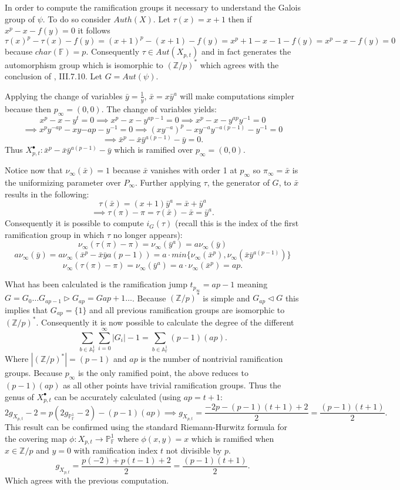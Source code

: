\documentclass[paper=a4, fontsize=11pt]{scrartcl} %
\numberwithin{equation}{section} %
\numberwithin{figure}{section} %
\numberwithin{table}{section} %
\theoremstyle{break}
\begin{document}
In order to compute the ramification groups it necessary to understand the Galois group of $\psi$. To do so consider $Auth(X)$. Let $\tau(x)=x+1$ then if $x^p - x - f(y) = 0$ it follows
$$
\tau(x)^p - \tau(x) - f(y) = (x+1)^p - (x+1) - f(y) = x^p + 1 - x - 1 - f(y) = x^p-x-f(y) = 0
$$
because $char(\mathbb{F})=p$. Consequently $\tau\in Aut(X_{p,t})$ and in fact generates the automorphism group which is isomorphic to $(\mathbb{Z}/p)^*$ which agrees with the conclusion of \cite{stitchenoth}, III.7.10. Let $G=Aut(\psi)$.

Applying the change of variables $\bar{y}=\frac{1}{y}$, $\bar{x}=x\bar{y}^a$ will make computations simpler because then $p_\infty = (0,0)$. The change of variables yields:
$$x^p-x-y^t = 0 \implies x^p-x-y^{ap-1}=0 \implies x^p-x-y^{ap}y^{-1}=0 $$
$$\implies x^p y^{-ap} -xy{-ap}-y^{-1}=0 \implies (xy^{-a})^p - xy^{-a}y^{-a(p-1)}-y^{-1}=0 $$
$$\implies \bar{x}^p-\bar{x}\bar{y}^{a(p-1)}-\bar{y} = 0.$$
Thus $X^{\bullet}_{p,t}: \bar{x}^p-\bar{x}\bar{y}^{a(p-1)}-\bar{y}$ which is ramified over $p_\infty = (0,0)$.

Notice now that $\nu_\infty(\bar{x}) = 1$ because $\bar{x}$ vanishes with order 1 at $p_\infty$ so $\pi_\infty = \bar{x}$ is the uniformizing parameter over $P_\infty$. Further applying $\tau$, the generator of $G$, to $\bar{x}$ results in the following:
$$\tau(\bar{x}) = (x+1)\bar{y}^a = \bar{x} + \bar{y}^a$$
$$\implies \tau(\pi)-\pi =  \tau(\bar{x}) - \bar{x} = \bar{y}^a.$$
Consequently it is possible to compute $i_G(\tau)$ (recall this is the index of the first ramification group in which $\tau$ no longer appears):
$$\nu_\infty(\tau(\pi)-\pi) = \nu_\infty(\bar{y}^a)=a\nu_\infty(\bar{y})$$
$$a\nu_\infty(\bar{y})=a\nu_\infty(\bar{x}^p - \bar{x}\bar{y}{a(p-1)})=a\cdot min\{\nu_\infty(\bar{x}^p),\nu_\infty(\bar{x}\bar{y}^{a(p-1)})\}$$
$$\nu_\infty(\tau(\pi)-\pi) = \nu_\infty(\bar{y}^a) = a\cdot\nu_\infty(\bar{x}^p)=ap.$$

What has been calculated is the ramification jump $t_{p_\infty} = ap-1$ meaning $G = G_0 \ldots G_{ap-1} \triangleright G_{ap} = G{ap+1}\ldots$. Because $(\mathbb{Z}/p)^*$ is simple and $G_{ap} \triangleleft G$ this implies that $G_{ap} = \{1\}$ and all previous ramification groups are isomorphic to $(\mathbb{Z}/p)^*$. Consequently it is now possible to calculate the degree of the different
$$
\sum_{b\in\mathbb{A}^1_\mathbb{F}} \sum_{i=0}^\infty |G_i| - 1 = \sum_{b\in\mathbb{A}^1_\mathbb{F}} (p-1)(ap).
$$
Where $|(\mathbb{Z}/p)^*|=(p-1)$ and $ap$ is the number of nontrivial ramification groups. Because $p_\infty$ is the only ramified point, the above reduces to $(p-1)(ap)$ as all other points have trivial ramification groups. Thus the genus of $X^\bullet_{p,t}$ can be accurately calculated (using $ap=t+1$:
$$
2g_{X_{p,t}} -2= p(2g_{\mathbb{P}^1_{\mathbb{F}}} -2) - (p-1)(ap) \implies  g_{X_{p,t}} = \frac{-2p-(p-1)(t+1)+2}{2}=\frac{(p-1)(t+1)}{2}.
$$
This result can be confirmed using the standard Riemann-Hurwitz formula for the covering map $\phi:X_{p,t} \to \mathbb{P}_\mathbb{F}^1$ where $\phi(x,y)=x$ which is ramified when $x\in \mathbb{Z}/p$ and $y=0$ with ramification index $t$ not divisible by $p$.
$$
g_{X_{p,t}} = \frac{p(-2) + p(t-1) +2}{2} = \frac{(p-1)(t+1)}{2}.
$$
Which agrees with the previous computation.
\clearpage
\printbibliography
\end{document}
